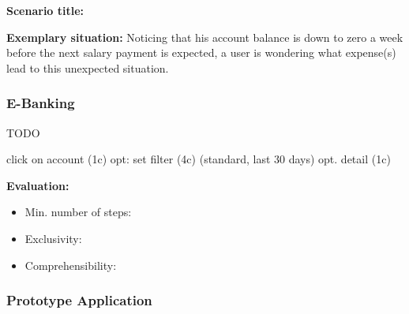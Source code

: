 \textbf{Scenario title:} \scenthree

\textbf{Exemplary situation:} Noticing that his account balance is down to zero a week before the next salary payment is expected, a user is wondering what expense(s) lead to this unexpected situation.



\subsubsection{E-Banking}

TODO

click on account (1c)
opt: set filter (4c) (standard, last 30 days)
opt. detail (1c)

\textbf{Evaluation:} 
\begin{itemize}[noitemsep,nolistsep]
	\item Min. number of steps: \textbf{}
	\item Exclusivity: \textbf{}
	\item Comprehensibility: \textbf{}
\end{itemize}



\subsubsection{Prototype Application}

